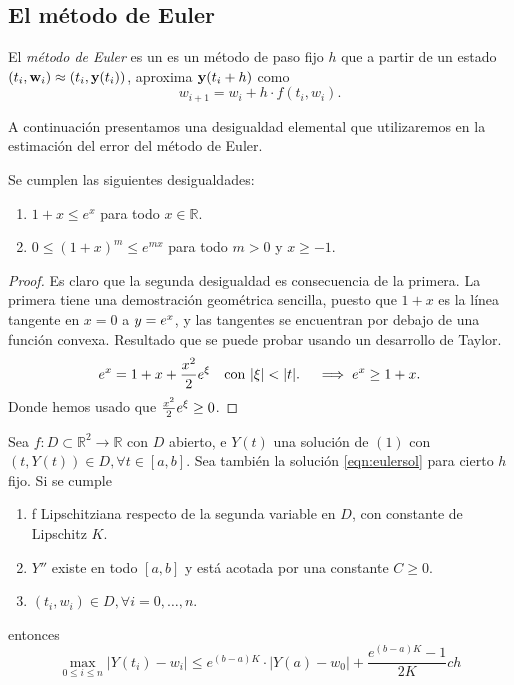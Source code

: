 \subsection{El método de Euler}

\begin{method}\label{met:euler}
    El \emph{método de Euler} es un es un método de paso fijo $h$ que
    a partir de un estado $(t_i, \vb{w}_i) \approx (t_i, \vb{y}(t_i))$,
    aproxima $\vb{y}(t_i + h)$ como
    \begin{equation*}
        w_{i+1} = w_i + h\cdot f(t_i, w_i).
    \end{equation*}
\end{method}

A continuación presentamos una desigualdad elemental que utilizaremos
en la estimación del error del método de Euler.

\begin{lemma}\label{lema2}
    Se cumplen las siguientes desigualdades:
    \begin{enumerate}
        \item $1 + x \le e^x$ para todo $x \in \mathbb{R}$.
        \item $0 \le (1+x)^m \le e^{mx}$ para todo $m > 0$ y $x \ge -1$.
    \end{enumerate} 
\end{lemma}

\begin{proof}
    Es claro que la segunda desigualdad es consecuencia de la primera.
    La primera tiene una demostración geométrica sencilla,
    puesto que $1 + x$ es la línea tangente en $x = 0$ a $y = e^x$,
    y las tangentes se encuentran por debajo de una función convexa.
    Resultado que se puede probar usando un desarrollo de Taylor.
    \begin{equation*}
        \nume^x = 1 + x + \frac{x^2}{2}\nume^\xi \qq{con $\abs{\xi} < \abs{t}.$}
        \implies \nume^x \ge 1+ x.
    \end{equation*}
    Donde hemos usado que $\frac{x^2}{2}e^\xi \ge 0$.
\end{proof}

\begin{theorem}
    Sea $f:D\subset \mathbb{R}^2\rightarrow \mathbb{R}$ con $D$ abierto,
    e $Y(t)$ una solución de $(1)$ con $(t,Y(t))\in D,\forall t\in[a,b]$.
    Sea también la solución \ref{eqn:eulersol} para cierto $h$ fijo.
    Si se cumple
    \begin{enumerate}[label=(\alph*)]
        \item f Lipschitziana respecto de la segunda variable en $D$, con constante de Lipschitz $K$.
        \item $Y''$ existe en todo $[a,b]$ y está acotada por una constante $C\ge 0$.
        \item $(t_i,w_i)\in D,\forall i=0,\dots,n$.
    \end{enumerate}
    entonces
    \begin{equation*}
        \max_{0\le i \le n}|Y(t_i)-w_i| \le e^{(b-a)K}\cdot |Y(a)-w_0| + \frac{e^{(b-a)K}-1}{2K}ch
    \end{equation*}
\end{theorem}

